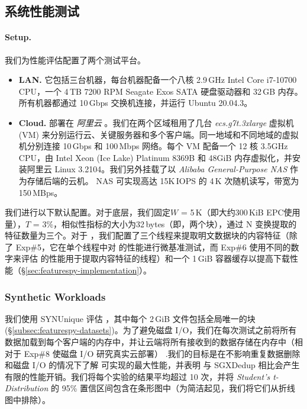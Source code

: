 \subsection{系统性能测试}
\label{subsec:featurespy-evaluation-performance}


\paragraph*{Setup.} 我们为性能评估配置了两个测试平台。

\begin{itemize}[leftmargin=*]
\item {\bf LAN.} 它包括三台机器，每台机器配备一个八核 2.9\,GHz Intel Core i7-10700 CPU，一个 4\,TB 7200 RPM Seagate Exos SATA 硬盘驱动器和 32\,GB 内存。所有机器都通过 10\,Gbps 交换机连接，并运行 Ubuntu 20.04.3。

\item {\bf Cloud.} 部署在 {\em 阿里云} \cite{alibaba}。我们在两个区域租用了几台 {\em ecs.g7t.3xlarge} 虚拟机 (VM) 来分别运行云、关键服务器和多个客户端。同一地域和不同地域的虚拟机分别连接 10\,Gbps 和 100\,Mbps 网络。每个 VM 配备一个 12 核 3.5GHz CPU，由 Intel Xeon (Ice Lake) Platinum 8369B 和 48GiB 内存虚拟化，并安装阿里云 Linux 3.2104。我们另外挂载了以 {\em Alibaba General-Purpose NAS} 作为存储后端的云机。 NAS 可实现高达 15K\,IOPS 的 4\,K 次随机读写，带宽为 150\,MBps。
\end{itemize}

我们进行以下默认配置。对于底层\sysnameF，我们固定$W$ = 5\,K（即大约300\,KiB EPC使用量），$T$ = 3\%，相似性指标的大小为32\,bytes（即，两个块），通过 N 变换提取的特征数量为三个。对于 \prototype，我们配置了三个线程来提取明文数据块的内容特征（除了 Exp\#5，它在单个线程中对 \prototype 的性能进行微基准测试，而 Exp\#6 使用不同的数字来评估 \prototype 的性能用于提取内容特征的线程）和一个 1\,GiB 容器缓存以提高下载性能（\S\ref{sec:featurespy-implementation}）。

\subsubsection{Synthetic Workloads}
\label{subsec:featurespy-syn}
我们使用 SYNUnique 评估 \prototype，其中每个 2\,GiB 文件包括全局唯一的块 (\S\ref{subsec:featurespy-datasets})。为了避免磁盘 I/O，我们在每次测试之前将所有数据加载到每个客户端的内存中，并让云端将所有接收到的数据存储在内存中（相对于 Exp\#8 使磁盘 I/O 研究真实云部署） .我们的目标是在不影响重复数据删除和磁盘 I/O 的情况下了解 \prototype 可实现的最大性能，并表明 \prototype 与 SGXDedup \cite{ren21} 相比会产生有限的性能开销。我们将每个实验的结果平均超过 10 次，并将 {\em Student's t-Distribution} 的 95\% 置信区间包含在条形图中（为简洁起见，我们将它们从折线图中排除）。

